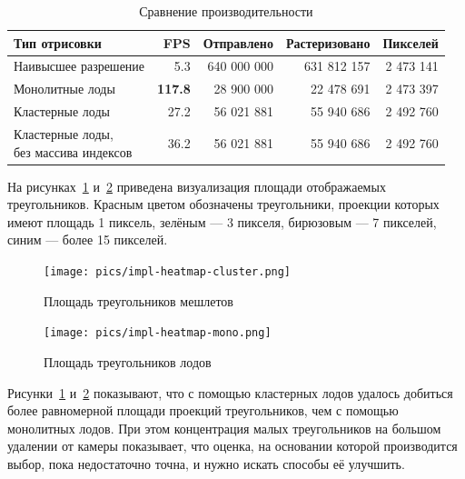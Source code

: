\begin{table}[h]
    \centering
    \begin{tabular}{lrrrr}
        \hline \hline
        Тип отрисовки
        & FPS
        & Отправлено
        & Растеризовано
        & Пикселей \\ \hline
        Наивысшее разрешение
        & 5.3
        & 640 000 000
        & 631 812 157
        & 2 473 141 \\
        Монолитные лоды
        & \textbf{117.8}
        & 28 900 000
        & 22 478 691
        & 2 473 397 \\
        Кластерные лоды
        & 27.2
        & 56 021 881
        & 55 940 686
        & 2 492 760 \\
        \makecell[l]{Кластерные лоды,\\ без массива индексов}
        & 36.2
        & 56 021 881
        & 55 940 686
        & 2 492 760 \\
        \hline \hline
    \end{tabular}

    \caption{Сравнение производительности}
    \label{tab:fps}
\end{table}

На рисунках~\ref{fig:impl-heatmap-cluster} и~\ref{fig:impl-heatmap-mono} приведена визуализация площади отображаемых треугольников.
Красным цветом обозначены треугольники, проекции которых имеют площадь 1 пиксель, зелёным --- 3 пикселя, бирюзовым --- 7 пикселей, синим --- более 15 пикселей.

\begin{figure}[H]
    \texttt{[image: pics/impl-heatmap-cluster.png]}
    \caption{Площадь треугольников мешлетов}
    \label{fig:impl-heatmap-cluster}
\end{figure}

\begin{figure}[H]
    \texttt{[image: pics/impl-heatmap-mono.png]}
    \caption{Площадь треугольников лодов}
    \label{fig:impl-heatmap-mono}
\end{figure}

Рисунки~\ref{fig:impl-heatmap-cluster} и~\ref{fig:impl-heatmap-mono} показывают, что с помощью кластерных лодов удалось добиться более равномерной площади проекций треугольников, чем с помощью монолитных лодов.
При этом концентрация малых треугольников на большом удалении от камеры показывает, что оценка, на основании которой производится выбор, пока недостаточно точна, и нужно искать способы её улучшить.

